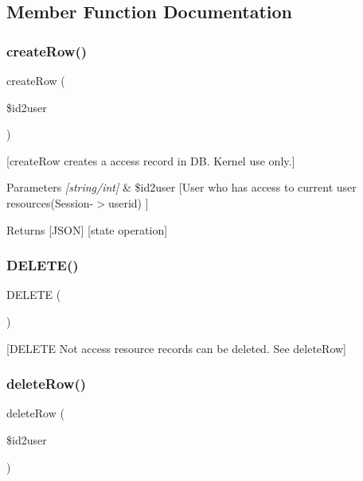 \subsection{Member Function Documentation}
\mbox{\label{class_access_aa70acba6d8f9c9393f138139449e2cff}} 
\subsubsection{\texorpdfstring{create\+Row()}{createRow()}}
{\footnotesize\ttfamily create\+Row (\begin{DoxyParamCaption}\item[{}]{\$id2user }\end{DoxyParamCaption})}

\mbox{[}create\+Row creates a access record in DB. Kernel use only.\mbox{]} 
\begin{DoxyParams}{Parameters}
{\em \mbox{[}string/int\mbox{]}} & \$id2user \mbox{[}User who has access to current user resources(Session-\/$>$userid) \mbox{]} \\
\hline
\end{DoxyParams}
\begin{DoxyReturn}{Returns}
\mbox{[}J\+S\+ON\mbox{]} \mbox{[}state operation\mbox{]} 
\end{DoxyReturn}
\mbox{\label{class_access_ab31369bc9c8f31518ed38c1949beb791}} 
\subsubsection{\texorpdfstring{D\+E\+L\+E\+T\+E()}{DELETE()}}
{\footnotesize\ttfamily D\+E\+L\+E\+TE (\begin{DoxyParamCaption}{ }\end{DoxyParamCaption})}

\mbox{[}D\+E\+L\+E\+TE Not access resource records can be deleted. See delete\+Row\mbox{]} \mbox{\label{class_access_a51906b13f88008ec2d5de18598b01216}} 
\subsubsection{\texorpdfstring{delete\+Row()}{deleteRow()}}
{\footnotesize\ttfamily delete\+Row (\begin{DoxyParamCaption}\item[{}]{\$id2user }\end{DoxyParamCaption})}

